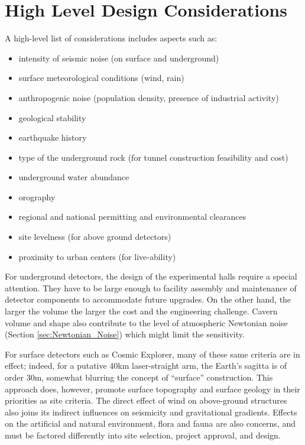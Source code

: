 \section{High Level Design Considerations}
\label{Req:Fac_Inf}
A high-level list of considerations includes aspects such as:
\begin{itemize}
\item intensity of seismic noise (on surface and underground)
\item surface meteorological conditions (wind, rain)
\item anthropogenic noise (population density, presence of industrial activity)
\item geological stability
\item earthquake history
\item type of the underground rock (for tunnel construction feasibility and cost) 
\item underground water abundance
\item orography
\item regional and national permitting and environmental clearances
\item site levelness (for above ground detectors)
\item proximity to urban centers (for live-ability)
\end{itemize}
\newpage
For underground detectors, the design of the %
experimental halls %
require a special attention. They have to be large enough %
to facility assembly and maintenance of detector components %
to accommodate future %
upgrades. On the other hand, the larger the volume the larger the cost and the engineering challenge. Cavern volume and shape also contribute to the level of atmospheric Newtonian noise (Section \ref{sec:Newtonian_Noise}) which might limit the sensitivity.

For surface %
detectors such as Cosmic Explorer, many of these same criteria are in effect; indeed, for a putative 40km laser-straight arm, the Earth’s sagitta is of order 30m, somewhat blurring the concept of “surface” construction. This approach does, however, promote surface topography and surface geology in their priorities as site criteria. The direct effect of wind on above-ground structures also joins its indirect influences on seismicity and gravitational gradients. Effects on the artificial and natural environment, flora and fauna are also concerns, and must be factored differently into site selection, project approval, and design. 

